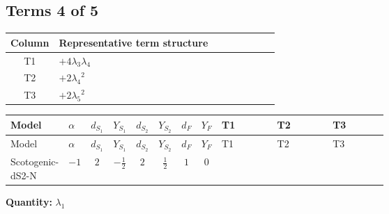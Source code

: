 \documentclass[8pt]{article}
\begin{document}
\begin{landscape}
\subsection*{Terms 4 of 5}
\begin{center}
\begin{tabular}{@{}c >{\raggedright\arraybackslash}p{0.82\linewidth}@{}}
\toprule
Column & Representative term structure \\
\midrule
T1 & \(\displaystyle +4 {\lambda_3} {\lambda_4}\) \\
\midrule
T2 & \(\displaystyle +2 {\lambda_4}^2\) \\
\midrule
T3 & \(\displaystyle +2 {\lambda_5}^2\) \\
\midrule
\bottomrule
\end{tabular}
\end{center}
\smallskip
\tiny
\begin{longtable}{@{}llcccccc >{\raggedright\arraybackslash}p{0.21\linewidth} >{\raggedright\arraybackslash}p{0.21\linewidth} >{\raggedright\arraybackslash}p{0.21\linewidth}@{}}
\toprule
Model & $\alpha$ & $d_{S_1}$ & $Y_{S_1}$ & $d_{S_2}$ & $Y_{S_2}$ & $d_F$ & $Y_F$ & T1 & T2 & T3 \\
\midrule
\endfirsthead
\toprule
Model & $\alpha$ & $d_{S_1}$ & $Y_{S_1}$ & $d_{S_2}$ & $Y_{S_2}$ & $d_F$ & $Y_F$ & T1 & T2 & T3 \\
\midrule
\endhead
Scotogenic-dS2-N & $-1$ & $2$ & $-\frac{1}{2}$ & $2$ & $\frac{1}{2}$ & $1$ & $0$ & \scriptsize\adjustbox{max width=\linewidth}{$\begin{gathered} +4 {\lambda_3} {\lambda_4}\end{gathered}$} & \scriptsize\adjustbox{max width=\linewidth}{$\begin{gathered} +2 {\lambda_4}^2\end{gathered}$} & \scriptsize\adjustbox{max width=\linewidth}{$\begin{gathered} +2 {\lambda_5}^2\end{gathered}$} \\
\midrule
\bottomrule
\end{longtable}
\clearpage
\noindent\textbf{Quantity: }$\lambda_1$\par\smallskip

\end{landscape}
\end{document}
